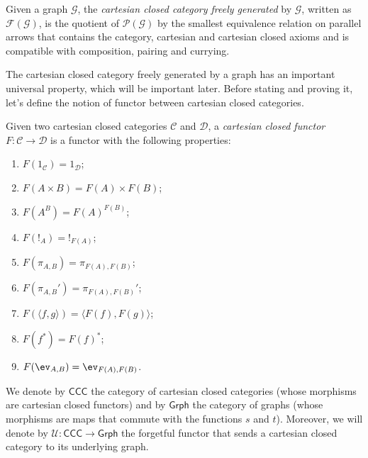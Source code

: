 \begin{definition}
    Given a graph $\mathcal G$, the \textit{cartesian closed category freely generated} by $\mathcal G$, written as $\mathcal F(\mathcal G)$,
    is the quotient of $\mathcal P(\mathcal G)$ by the smallest equivalence relation on parallel arrows that contains the category, cartesian and cartesian closed axioms and is compatible with composition, pairing and currying.
\end{definition}

The cartesian closed category freely generated by a graph has an important universal property, which will be important later.
Before stating and proving it, let's define the notion of functor between cartesian closed categories.

\begin{definition}
    Given two cartesian closed categories $\mathcal C$ and $\mathcal D$, a \textit{cartesian closed functor} $F : \mathcal C \to \mathcal D$ is a functor with the following properties:
    \begin{enumerate}[label=(\textit{\roman*})]
        \item $F(1_\mathcal C) = 1_\mathcal D$;
        \item $F(A \times B) = F(A) \times F(B)$;
        \item $F(A^B) = F(A)^{F(B)}$;
        \item $F(!_A) = !_{F(A)}$;
        \item $F(\pi_{A,B}) = \pi_{F(A),F(B)}$;
        \item $F(\pi_{A,B}') = \pi_{F(A),F(B)}'$;
        \item $F(\langle f,g\rangle) = \langle F(f), F(g)\rangle$;
        \item $F(f^*) = F(f)^*$;
        \item $F(\ev_{A,B}) = \ev_{F(A),F(B)}$.
    \end{enumerate}
\end{definition}

\begin{notation}
    We denote by $\mathsf{CCC}$ the category of cartesian closed categories (whose morphisms are cartesian closed functors) and by $\mathsf{Grph}$ the category of graphs (whose morphisms are maps that commute with the functions $s$ and $t$).
    Moreover, we will denote by $\mathcal U : \mathsf{CCC} \to \mathsf{Grph}$ the forgetful functor that sends a cartesian closed category to its underlying graph.
\end{notation}

